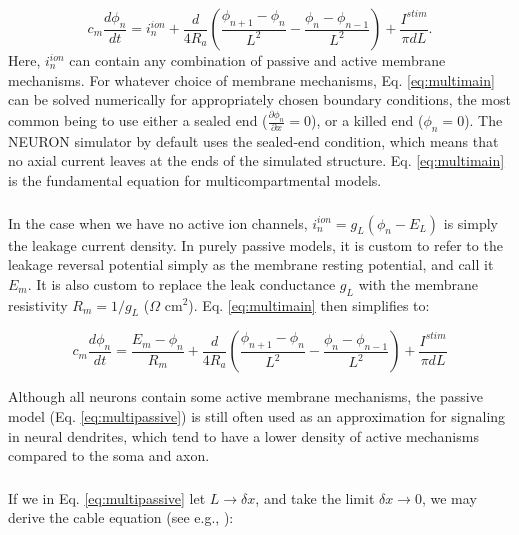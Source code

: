 \begin{equation}
c_m \frac{d\phi_n}{dt} = i_n^{ion} + \frac{d}{4R_a}\left(\frac{\phi_{n+1}-\phi_n}{L^2} - \frac{\phi_n-\phi_{n-1}}{L^2} \right) + \frac{I^{stim}}{\pi d L}.
\label{eq:multimain}
\end{equation}
Here,  $i_n^{ion}$ can contain any combination of passive and active membrane mechanisms. For whatever choice of membrane mechanisms, Eq. \ref{eq:multimain} can be solved numerically for appropriately chosen boundary conditions, the most common being to use either a sealed end ($\frac{\partial \phi_n}{\partial x} = 0$), or a killed end ($\phi_n=0$). The NEURON simulator by default uses the sealed-end condition, which means that no axial current leaves at the ends of the simulated structure. Eq. \ref{eq:multimain} is the fundamental equation for multicompartmental models.


\subsubsection{}
In the case when we have no active ion channels, $i_n^{ion} = g_L(\phi_n - E_L)$ is simply the leakage current density. In purely passive models, it is custom to refer to the leakage reversal potential simply as the membrane resting potential, and call it $E_m$. It is also custom to replace the leak conductance $g_L$ with the membrane resistivity $R_m = 1/g_L$ ($\Omega$ cm$^2$). Eq. \ref{eq:multimain} then simplifies to:

\begin{equation}
c_m \frac{d\phi_n}{dt} = \frac{E_m-\phi_n}{R_m} + \frac{d}{4R_a}\left(\frac{\phi_{n+1}-\phi_n}{L^2} - \frac{\phi_n-\phi_{n-1}}{L^2} \right) + \frac{I^{stim}}{\pi d L}
\label{eq:multipassive}
\end{equation}

Although all neurons contain some active membrane mechanisms, the passive model (Eq. \ref{eq:multipassive}) is still often used as an approximation for signaling in neural dendrites, which tend to have a lower density of active mechanisms compared to the soma and axon. 


\subsubsection{}
If we in Eq. \ref{eq:multipassive} let $L \rightarrow \delta x$, and take the limit $\delta x \rightarrow 0$, we may derive the cable equation (see e.g., \cite{Sterratt2011}): 

